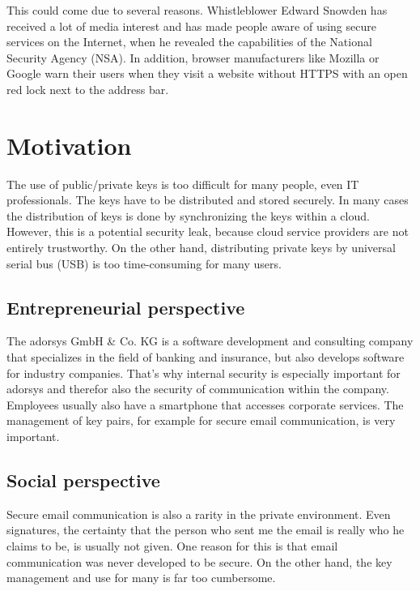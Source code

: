 \documentclass[12pt,oneside,a4paper,parskip]{scrbook}
\begin{document}
This could come due to several reasons. Whistleblower Edward Snowden has received a lot of media interest and has made people aware of using secure services on the Internet, when he revealed the capabilities of the National Security Agency (NSA). In addition, browser manufacturers like Mozilla or Google warn their users when they visit a website without HTTPS with an open red lock next to the address bar.


\section{Motivation}

The use of public/private keys is too difficult for many people, even IT professionals. The keys have to be distributed and stored securely. In many cases the distribution of keys is done by synchronizing the keys within a cloud. However, this is a potential security leak, because cloud service providers are not entirely trustworthy. On the other hand, distributing private keys
by universal serial bus (USB) is too time-consuming for many users.

\subsection{Entrepreneurial perspective}

The adorsys GmbH \& Co. KG is a software development and consulting company that specializes in the field of banking and insurance, but also develops software for industry companies. That's why internal security is especially important for adorsys and therefor also the security of communication within the company. Employees usually also have a smartphone that accesses corporate services. The management of key pairs, for example for secure email communication, is very important. 

\subsection{Social perspective}

Secure email communication is also a rarity in the private environment. Even signatures, the certainty that the person who sent me the email is really who he claims to be, is usually not given. 
One reason for this is that email communication was never developed to be secure. On the other hand, the key management and use for many is far too cumbersome. 
\end{document}
